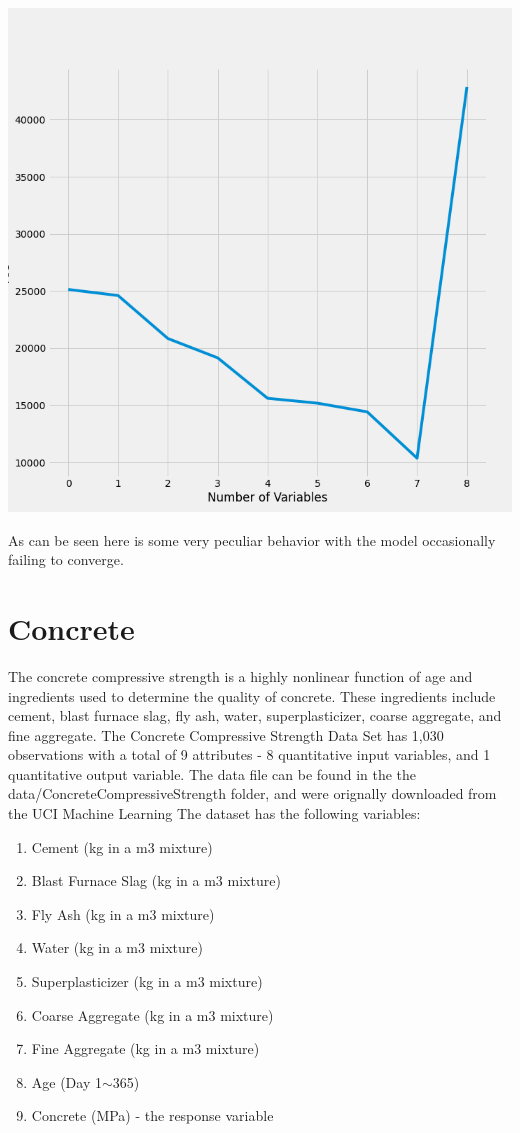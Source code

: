 \documentclass{article}
\begin{document}
	\includegraphics[scale = 0.2]{../plots/python/AICStepwise4L.png}
	
	As can be seen here is some very peculiar behavior with the model 
	occasionally failing to converge.
	
	\section{Concrete}
	
	The concrete compressive strength is a highly nonlinear function of age and ingredients used to determine the quality 
	of concrete. These ingredients include cement, blast furnace slag, fly ash, water, superplasticizer, coarse aggregate, 
	and fine aggregate. The Concrete Compressive Strength Data Set has 1,030 observations with a total of 9 attributes - 8 
	quantitative input variables, and 1 quantitative output variable. The data file can be found in the the data/ConcreteCompressiveStrength 
	folder, and were orignally downloaded from the UCI Machine Learning The dataset has the following variables: 
	
	\begin{enumerate}
		\item Cement (kg in a m3 mixture)
		\item Blast Furnace Slag (kg in a m3 mixture)
		\item Fly Ash (kg in a m3 mixture)
		\item Water (kg in a m3 mixture)
		\item Superplasticizer (kg in a m3 mixture)
		\item Coarse Aggregate (kg in a m3 mixture)
		\item Fine Aggregate (kg in a m3 mixture)
		\item Age (Day 1$\sim$365)
		\item Concrete (MPa) - the response variable
	\end{enumerate}
\end{document}
